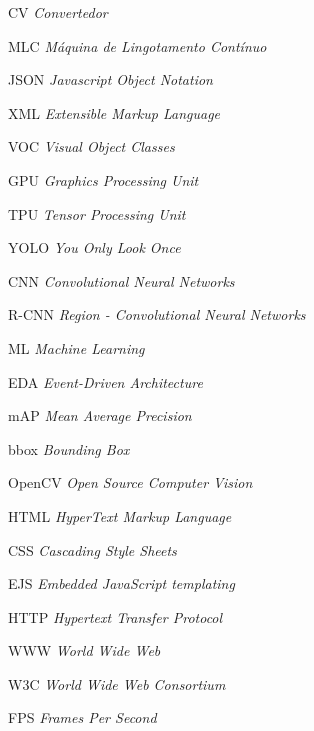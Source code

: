 \documentclass[
	12pt,				%
	oneside,
	a4paper,			%
	english,			%
	brazil				%
	]{abntex2ufop} %
\begin{document}
\listoftables*
\cleardoublepage

\renewcommand{\lstlistingname}{Código}
\renewcommand{\lstlistlistingname}{Lista de códigos}
\lstlistoflistings
\cleardoublepage

\begin{siglas}
  \item[CV] \textit{Convertedor}
  \item[MLC] \textit{Máquina de Lingotamento Contínuo}
  \item[JSON] \textit{Javascript Object Notation}
  \item[XML] \textit{Extensible Markup Language}
  \item[VOC] \textit{Visual Object Classes}
  \item[GPU] \textit{Graphics Processing Unit}
  \item[TPU] \textit{Tensor Processing Unit}
  \item[YOLO] \textit{You Only Look Once}
  \item[CNN] \textit{Convolutional Neural Networks}
  \item[R-CNN] \textit{Region - Convolutional Neural Networks}
  \item[ML] \textit{Machine Learning}
  \item[EDA] \textit{Event-Driven Architecture}
  \item[mAP] \textit{Mean Average Precision}
  \item[bbox] \textit{Bounding Box}
  \item[OpenCV] \textit{Open Source Computer Vision}
  \item[HTML] \textit{HyperText Markup Language}
  \item[CSS] \textit{Cascading Style Sheets}
  \item[EJS] \textit{Embedded JavaScript templating}
  \item[HTTP] \textit{Hypertext Transfer Protocol}
  \item[WWW] \textit{World Wide Web}
  \item[W3C] \textit{World Wide Web Consortium}
  \item[FPS] \textit{Frames Per Second}
  
  
\end{siglas}
\end{document}
